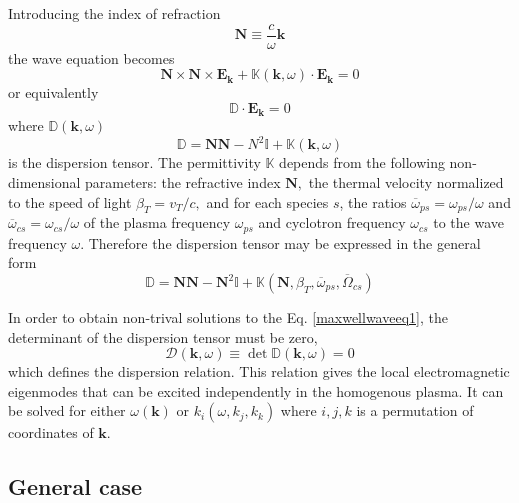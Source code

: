 \documentclass[a4paper,12pt]{article}%
\begin{document}
Introducing the index of refraction%
\begin{equation}
\mathbf{N\equiv}\frac{c}{\omega}\mathbf{k} \label{indexrefraction}%
\end{equation}
the wave equation becomes%
\begin{equation}
\mathbf{N}\times\mathbf{N}\times\mathbf{E}_{\mathbf{k}}+\mathbb{K}\left(
\mathbf{k},\omega\right)  \cdot\mathbf{E}_{\mathbf{k}}=0
\end{equation}
or equivalently%
\begin{equation}
\mathbb{D}\cdot\mathbf{E}_{\mathbf{k}}=0 \label{maxwellwaveeq1}%
\end{equation}
where $\mathbb{D}\left(  \mathbf{k},\omega\right)  $
\begin{equation}
\mathbb{D}=\mathbf{NN}-N^{2}\mathbb{I}+\mathbb{K}\left(  \mathbf{k}%
,\omega\right)  \label{Maxwelltensor}%
\end{equation}
is the dispersion tensor. The permittivity $\mathbb{K}$ depends from the
following non-dimensional parameters: the refractive index $\mathbf{N,}$ the
thermal velocity normalized to the speed of light $\beta_{T}=v_{T}/c,$ and for
each species $s$, the ratios $\overline{\omega}_{ps}=\omega_{ps}/\omega$ and
$\overline{\omega}_{cs}=\omega_{cs}/\omega$ of the plasma frequency
$\omega_{ps}$ and cyclotron frequency $\omega_{cs}$ to the wave frequency
$\omega$. Therefore the dispersion tensor may be expressed in the general form%
\begin{equation}
\mathbb{D=}\mathbf{NN-N}^{2}\mathbb{I}+\mathbb{K}\left(  \mathbf{N},\beta
_{T},\overline{\omega}_{ps},\overline{\Omega}_{cs}\right)
\end{equation}


In order to obtain non-trival solutions to the Eq. \ref{maxwellwaveeq1}, the
determinant of the dispersion tensor must be zero,
\begin{equation}
\mathcal{D}\left(  \mathbf{k},\omega\right)  \equiv\det\mathbb{D}\left(
\mathbf{k},\omega\right)  =0 \label{dispersionrelation}%
\end{equation}
which defines the dispersion relation. This relation gives the local
electromagnetic eigenmodes that can be excited independently in the homogenous
plasma. It can be solved for either $\omega\left(  \mathbf{k}\right)  $ or
$k_{i}\left(  \omega,k_{j},k_{k}\right)  $ where $i,j,k$ is a permutation of
coordinates of $\mathbf{k}$.

\subsection{General case}
\end{document}
